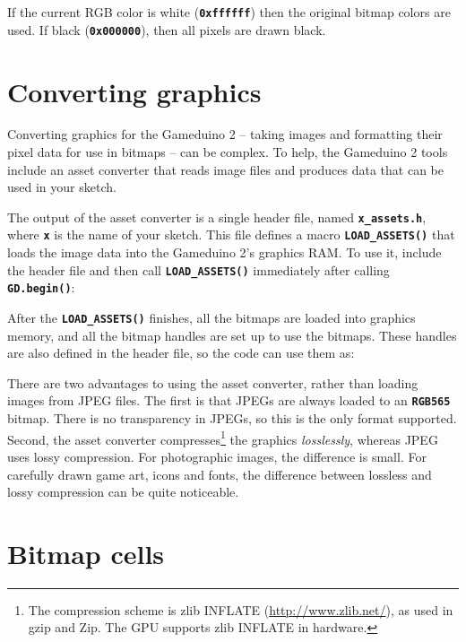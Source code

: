 \documentclass[10pt]{book}
\newcommand{\mach}[1]{\texttt{\textbf{#1}}}
\begin{document}

If the current RGB color is white (\mach{0xffffff}) then 
the original bitmap colors are used.
If black (\mach{0x000000}), then all pixels are drawn black.
\clearpage

\newpage
\section{Converting graphics}
\label{assets}

Converting graphics for the Gameduino 2 -- taking images and formatting their pixel data for
use in bitmaps -- can be complex.
To help, the Gameduino 2 tools include an asset converter that reads image files and produces data that can be used in your sketch.

The output of the asset converter is a single header file, named \mach{x\_assets.h}, where
\mach{x} is the name of your sketch.
This file defines
a macro \mach{LOAD\_ASSETS()} that loads the image data into the
Gameduino 2's graphics RAM.
To use it, include the header file and then call \mach{LOAD\_ASSETS()} immediately after calling \mach{GD.begin()}:


After the \mach{LOAD\_ASSETS()} finishes, all the bitmaps are loaded into graphics memory,
and all the bitmap handles are set up to use the bitmaps.
These handles are also defined in the header file, so the code can use them as:


There are two advantages to using the asset converter, rather than loading images from JPEG files.
The first is that JPEGs are always loaded to an \mach{RGB565} bitmap.
There is no transparency in JPEGs, so this is the only format supported.
Second, the asset converter compresses\footnote{
The compression scheme is zlib INFLATE
(\url{http://www.zlib.net/}), as used in gzip and Zip.
The GPU supports zlib INFLATE in hardware.
} the graphics \textit{losslessly},
whereas JPEG uses lossy compression.
For photographic images, the difference is small.
For carefully drawn game art, icons and fonts, the difference between lossless and lossy compression can be quite noticeable.

\newpage
\section{Bitmap cells}
\end{document}
